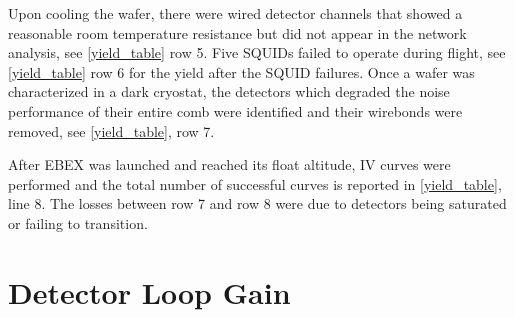 Upon cooling the wafer, there were wired detector channels that showed a reasonable room temperature resistance but did not appear in the network analysis, see \TAB\ref{yield_table} row 5. 
Five \ac{SQUID}s failed to operate during flight, see \TAB\ref{yield_table} row 6 for the yield after the \ac{SQUID} failures. 
Once a wafer was characterized in a dark cryostat, the detectors which degraded the noise performance of their entire comb were identified and their wirebonds were removed, see \TAB\ref{yield_table}, row 7. 

After \ac{EBEX} was launched and reached its float altitude, IV curves were performed and the total number of successful curves is reported in \TAB\ref{yield_table}, line 8. 
The losses between row 7 and row 8 were due to detectors being saturated or failing to transition. 

%
%
\section{Detector Loop Gain}
\label{sec:loop_gain}

